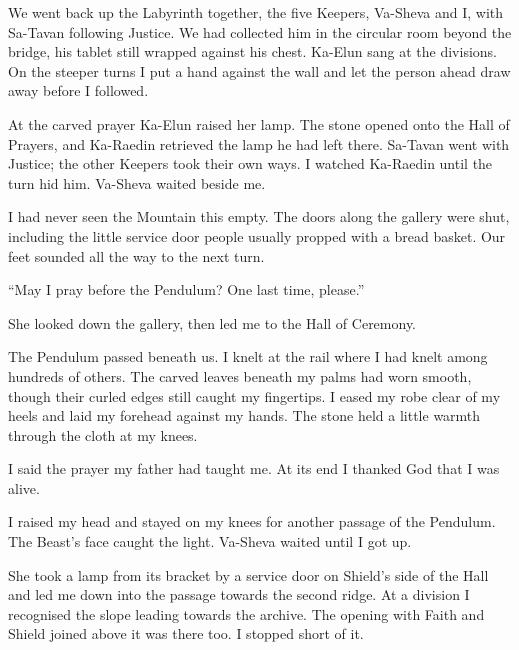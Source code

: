 

We went back up the Labyrinth together, the five Keepers, Va-Sheva and I, with Sa-Tavan following Justice. We had collected him in the circular room beyond the bridge, his tablet still wrapped against his chest. Ka-Elun sang at the divisions. On the steeper turns I put a hand against the wall and let the person ahead draw away before I followed.\par

At the carved prayer Ka-Elun raised her lamp. The stone opened onto the Hall of Prayers, and Ka-Raedin retrieved the lamp he had left there. Sa-Tavan went with Justice; the other Keepers took their own ways. I watched Ka-Raedin until the turn hid him. Va-Sheva waited beside me.\par

I had never seen the Mountain this empty. The doors along the gallery were shut, including the little service door people usually propped with a bread basket. Our feet sounded all the way to the next turn.\par

``May I pray before the Pendulum? One last time, please.''\par

She looked down the gallery, then led me to the Hall of Ceremony.\par

The Pendulum passed beneath us. I knelt at the rail where I had knelt among hundreds of others. The carved leaves beneath my palms had worn smooth, though their curled edges still caught my fingertips. I eased my robe clear of my heels and laid my forehead against my hands. The stone held a little warmth through the cloth at my knees.\par

I said the prayer my father had taught me. At its end I thanked God that I was alive.\par

I raised my head and stayed on my knees for another passage of the Pendulum. The Beast's face caught the light. Va-Sheva waited until I got up.\par

She took a lamp from its bracket by a service door on Shield's side of the Hall and led me down into the passage towards the second ridge. At a division I recognised the slope leading towards the archive. The opening with Faith and Shield joined above it was there too. I stopped short of it.\par

